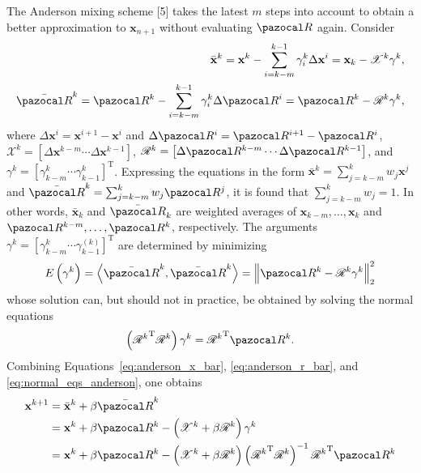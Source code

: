 The Anderson mixing scheme [5] takes the latest \(m\) steps into account to obtain a better approximation to \(\mathbf x_{n+1}\) without evaluating \(\pazocal R\) again.
Consider
\begin{align}
  \bar{\mathbf x}^{k}=\mathbf x^{k}-\sum_{i=k-m}^{k-1} \gamma_{i}^{k} \Delta \mathbf x^{i}=\mathbf x_{k}-\mathscr{X}^{k} \gamma^{k}, \label{eq:anderson_x_bar}\\
  \bar{\pazocal R}^{k}=\pazocal R^{k}-\sum_{i=k-m}^{k-1} \gamma_{i}^{k} \Delta \pazocal R^{i}=\pazocal R^{k}-\mathscr{R}^{k} \gamma^{k} \label{eq:anderson_r_bar},
\end{align}
where \(\Delta \mathbf x^{i}=\mathbf x^{i+1}-\mathbf x^{i}\) and \(\Delta \pazocal R^{i}=\pazocal R^{i+1}-\pazocal R^{i}\), \(\mathscr{X}^{k}=\left[\Delta \mathbf x^{k-m} \cdots \Delta \mathbf x^{k-1}\right]\), \(\mathscr{R}^{k}=\left[\Delta \pazocal R^{k-m} \cdots \Delta \pazocal R^{k-1}\right]\), and \(\gamma^{k}=\left[\gamma_{k-m}^{k} \cdots \gamma_{k-1}^{k}\right]^{\mathrm{T}}\).
Expressing the equations in the form \(\bar{\mathbf x}^{k}=\sum_{j=k-m}^{k} w_{j} \mathbf x^{j}\) and \(\bar{\pazocal R}^{k}=\sum_{j=k-m}^{k} w_{j} \pazocal R^{j}\), it is found that \(\sum_{j=k-m}^{k} w_{j}=1\).
In other words, \(\bar{\mathbf x}_{k}\) and \(\bar{\pazocal R}_{k}\) are weighted averages of \(\mathbf x_{k-m}, \ldots, \mathbf x_{k}\) and \(\pazocal R^{k-m}, \ldots, \pazocal R^{k}\), respectively.
The arguments \(\gamma^{k}=\left[\gamma_{k-m}^{k} \cdots \gamma_{k-1}^{(k)}\right]^{\mathrm{T}}\) are determined by minimizing
\begin{equation}
E\left(\gamma^{k}\right)=\left\langle\bar{\pazocal R}^{k}, \bar{\pazocal R}^{k}\right\rangle=\left\|\pazocal R^{k}-\mathscr{R}^{k} \gamma^{k}\right\|_{2}^{2}
\end{equation}
whose solution can, but should not in practice, be obtained by solving the normal equations
\begin{equation}
\left({\mathscr{R}^{k}}^{\mathrm{T}} \mathscr{R}^{k}\right) \gamma^{k}={\mathscr{R}^{k}}^{\mathrm{T}} \pazocal R^{k}. \label{eq:normal_eqs_anderson}
\end{equation}
Combining Equations~\eqref{eq:anderson_x_bar}, \eqref{eq:anderson_r_bar}, and \eqref{eq:normal_eqs_anderson}, one obtains
\begin{align}
\mathbf x^{k+1} &=\bar{\mathbf x}^{k}+\beta \bar{\pazocal R}^{k} \\
&=\mathbf x^{k}+\beta \pazocal R^{k}-\left(\mathscr{X}^{k}+\beta \mathscr{R}^{k}\right) \gamma^{k} \\
&=\mathbf x^{k}+\beta \pazocal R^{k}-\left(\mathscr{X}^{k}+\beta \mathscr{R}^{k}\right)\left({\mathscr{R}^{k}}^{\mathrm{T}} \mathscr{R}^{k}\right)^{-1} {\mathscr{R}^{k}}^{\mathrm{T}} \pazocal R^{k} \label{eq:update_anderson_mixing}
\end{align}
